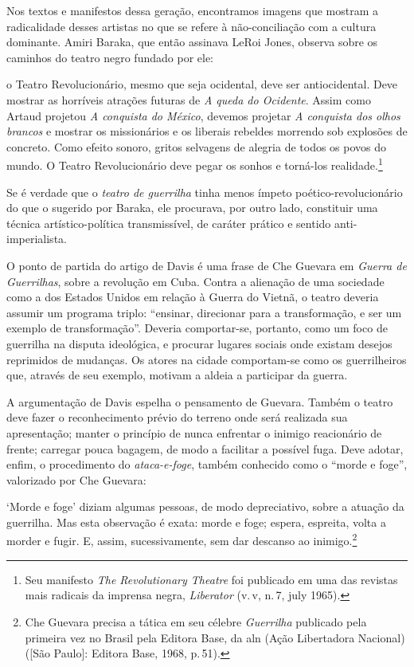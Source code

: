 Nos textos e manifestos dessa geração, encontramos imagens que mostram a
radicalidade desses artistas no que se refere à não-conciliação com a
cultura dominante. Amiri Baraka, que então assinava LeRoi Jones, observa
sobre os caminhos do teatro negro fundado por ele:

\startblockquote
o Teatro Revolucionário, mesmo que seja ocidental, deve ser
antiocidental. Deve mostrar as horríveis atrações futuras de {\it A
queda do Ocidente}. Assim como Artaud projetou {\it A conquista do
México}, devemos projetar {\it A conquista dos olhos brancos} e mostrar
os missionários e os liberais rebeldes morrendo sob explosões de
concreto. Como efeito sonoro, gritos selvagens de alegria de todos os
povos do mundo. O Teatro Revolucionário deve pegar os sonhos e torná-los
realidade.\footnote{Seu manifesto {\it The Revolutionary Theatre} foi
  publicado em uma das revistas mais radicais da imprensa negra,
  {\it Liberator} (v.\,{\sc v}, n.\,7, july 1965).}
\stopblockquote

Se é verdade que o {\it teatro de guerrilha} tinha menos ímpeto
poético-revolucionário do que o sugerido por Baraka, ele procurava, por
outro lado, constituir uma técnica artístico-política transmissível, de
caráter prático e sentido anti-imperialista.

O ponto de partida do artigo de Davis é uma frase de Che Guevara em
{\it Guerra de Guerrilhas}, sobre a revolução em Cuba. Contra a
alienação de uma sociedade como a dos Estados Unidos em relação à Guerra
do Vietnã, o teatro deveria assumir um programa triplo: “ensinar,
direcionar para a transformação, e ser um exemplo de transformação”.
Deveria comportar-se, portanto, como um foco de guerrilha na disputa
ideológica, e procurar lugares sociais onde existam desejos reprimidos
de mudanças. Os atores na cidade comportam-se como os guerrilheiros que,
através de seu exemplo, motivam a aldeia a participar da guerra.

A argumentação de Davis espelha o pensamento de Guevara. Também o teatro
deve fazer o reconhecimento prévio do terreno onde será realizada sua
apresentação; manter o princípio de nunca enfrentar o inimigo
reacionário de frente; carregar pouca bagagem, de modo a facilitar a
possível fuga. Deve adotar, enfim, o procedimento do {\it ataca-e-foge},
também conhecido como o “morde e foge”, valorizado por Che Guevara:

\startblockquote
‘Morde e foge' diziam algumas pessoas, de modo depreciativo, sobre a
atuação da guerrilha. Mas esta observação é exata: morde e foge; espera,
espreita, volta a morder e fugir. E, assim, sucessivamente, sem dar
descanso ao inimigo.\footnote{Che Guevara precisa a tática em seu
  célebre {\it Guerrilha} publicado pela primeira vez no Brasil pela
  Editora Base, da {\sc aln} (Ação Libertadora Nacional) ({[}São Paulo{]}:
  Editora Base, 1968, p.\,51).}
\stopblockquote

